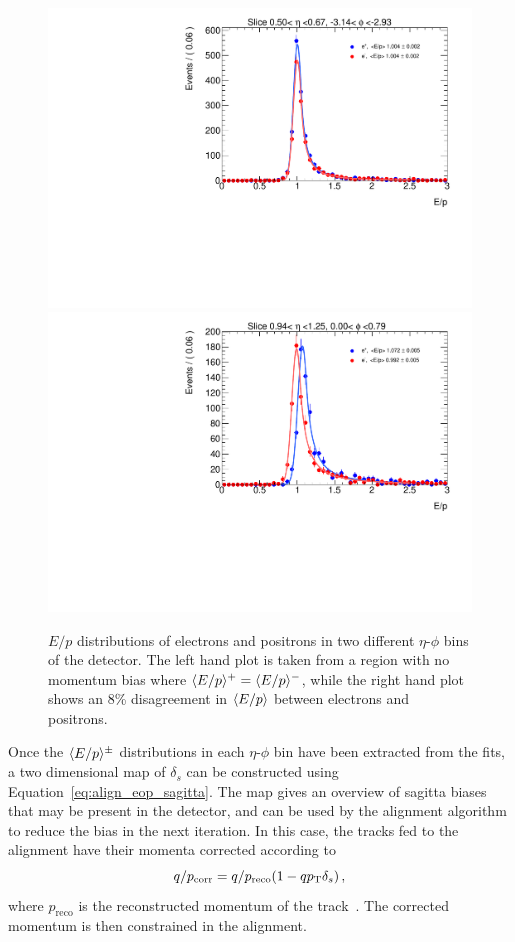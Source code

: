 \begin{figure}[htbp]
  \centering
  \includegraphics[width=.48\textwidth]{figs/alignment/eop/eop_fit_nobias}
  \includegraphics[width=.48\textwidth]{figs/alignment/eop/eop_fit_bias}
  \caption{$E/p$ distributions of electrons and positrons in two different $\eta$-$\phi$ bins of the detector.  The left hand plot is taken from a region with no momentum bias where $\langle E/p\rangle^+ = \langle E/p\rangle^-$, while the right hand plot shows an 8\% disagreement in $\langle E/p\rangle$ between electrons and positrons.}
  \label{fig:alignment_eop_fit}
\end{figure}

Once the $\langle E/p\rangle^\pm$ distributions in each $\eta$-$\phi$ bin have been extracted from the fits, a two dimensional map of $\delta_s$ can be constructed using Equation~\ref{eq:align_eop_sagitta}.
The map gives an overview of sagitta biases that may be present in the detector, and can be used by the alignment algorithm to reduce the bias in the next iteration.
In this case, the tracks fed to the alignment have their momenta corrected according to
\begin{equation}
q/p_{\textrm{corr}} = q/p_{\textrm{reco}}(1-qp_{\mathrm{T}}\delta_s)\,,
\end{equation}
where $p_{\textrm{reco}}$ is the reconstructed momentum of the track~\cite{2012.alignment-systematics}.
The corrected momentum is then constrained in the alignment.

